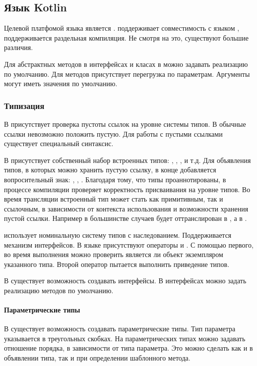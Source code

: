 \subsection{Язык Kotlin}

Целевой платфомой языка  является .  поддерживает совместимость с языком  \cite{kotlin:compatibility}, поддерживается раздельная компиляция. Не смотря на это, существуют большие различия.

Для абстрактных методов в интерфейсах и класах в  можно задавать реализацию по умолчанию. Для методов присутствует перегрузка по параметрам. Аргументы могут иметь значения по умолчанию.

\subsubsection{Типизация}
В  присутствует проверка пустоты ссылок на уровне системы типов. В обычные ссылки невозможно положить пустую. Для работы с пустыми ссылками существует специальный синтаксис.

В  присутствует собственный набор встроенных типов: , , , и т.д. Для объявления типов, в которых можно хранить пустую ссылку, в конце добавляется вопросительный знак: , , . Благодаря тому, что типы проаннотированы, в процессе компиляции  проверяет корректность присваивания на уровне типов. Во время трансляции встроенный тип может стать как примитивным, так и ссылочным, в зависимости от контекста использования и возможности хранения пустой ссылки. Например в большинстве случаев  будет оттранслирован в , а  в .

 использует номинальную систему типов с наследованием. Поддерживается механизм интерфейсов. В языке присутствуют операторы  и . С помощью первого, во время выполнения можно проверить является ли объект экземпляром указанного типа. Второй оператор пытается выполнить приведение типов.

В  существует возможность создавать интерфейсы. В интерфейсах можно задать реализацию методов по умолчанию.

\paragraph{Параметрические типы}
В  существует возможность создавать параметрические типы. Тип параметра указывается в треугольных скобках. На параметрических типах можно задавать отношение порядка, в зависимости от типа параметра. Это можно сделать как и в объявлении типа, так и при определении шаблонного метода.
